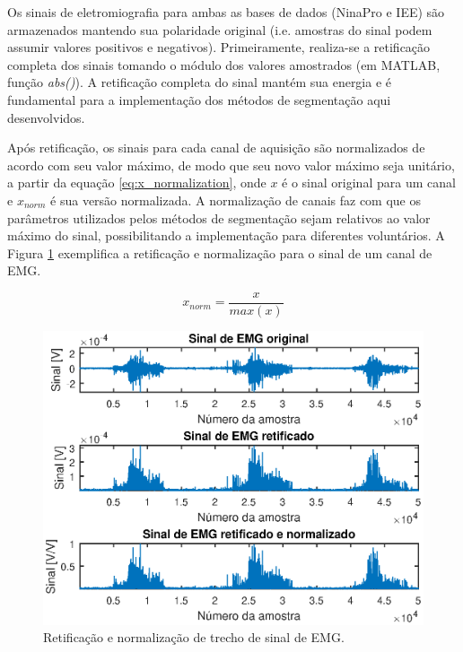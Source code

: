Os sinais de eletromiografia para ambas as bases de dados (NinaPro e IEE) são armazenados mantendo sua polaridade original (i.e. amostras do sinal podem assumir valores positivos e negativos). Primeiramente, realiza-se a retificação completa dos sinais tomando o módulo dos valores amostrados (em MATLAB, função \emph{abs()}). A retificação completa do sinal mantém sua energia e é fundamental para a implementação dos métodos de segmentação aqui desenvolvidos.

Após retificação, os sinais para cada canal de aquisição são normalizados de acordo com seu valor máximo, de modo que seu novo valor máximo seja unitário, a partir da equação \ref{eq:x_normalization}, onde $x$ é o sinal original para um canal e $x_{norm}$ é sua versão normalizada. A normalização de canais faz com que os parâmetros utilizados pelos métodos de segmentação sejam relativos ao valor máximo do sinal, possibilitando a implementação para diferentes voluntários. A Figura \ref{fig:normalization} exemplifica a retificação e normalização para o sinal de um canal de EMG.

\begin{equation}
	\label{eq:x_normalization}
	x_{norm} = \frac{x}{max(x)}
\end{equation}

\begin{figure}[htb]
	\caption{\label{fig:normalization}Retificação e normalização de trecho de sinal de EMG.}
	\begin{center}
	    \includegraphics[width=0.75\linewidth]{./img/matlab/prettyRaw.eps}
	\end{center}
\end{figure}

